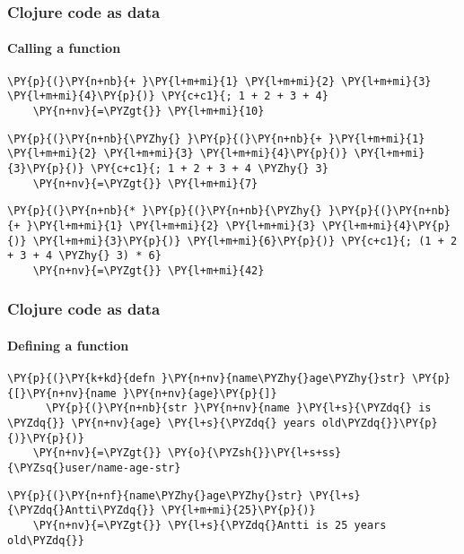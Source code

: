 \begin{frame}[fragile]
  \frametitle{Clojure code as data}
  \framesubtitle {Calling a function}


  \begin{Verbatim}[commandchars=\\\{\}]
    \PY{p}{(}\PY{n+nb}{+ }\PY{l+m+mi}{1} \PY{l+m+mi}{2} \PY{l+m+mi}{3} \PY{l+m+mi}{4}\PY{p}{)} \PY{c+c1}{; 1 + 2 + 3 + 4}
    \PY{n+nv}{=\PYZgt{}} \PY{l+m+mi}{10}
  \end{Verbatim}
  \pause

  \begin{Verbatim}[commandchars=\\\{\}]
    \PY{p}{(}\PY{n+nb}{\PYZhy{} }\PY{p}{(}\PY{n+nb}{+ }\PY{l+m+mi}{1} \PY{l+m+mi}{2} \PY{l+m+mi}{3} \PY{l+m+mi}{4}\PY{p}{)} \PY{l+m+mi}{3}\PY{p}{)} \PY{c+c1}{; 1 + 2 + 3 + 4 \PYZhy{} 3}
    \PY{n+nv}{=\PYZgt{}} \PY{l+m+mi}{7}
  \end{Verbatim}

  \pause
  \begin{Verbatim}[commandchars=\\\{\}]
    \PY{p}{(}\PY{n+nb}{* }\PY{p}{(}\PY{n+nb}{\PYZhy{} }\PY{p}{(}\PY{n+nb}{+ }\PY{l+m+mi}{1} \PY{l+m+mi}{2} \PY{l+m+mi}{3} \PY{l+m+mi}{4}\PY{p}{)} \PY{l+m+mi}{3}\PY{p}{)} \PY{l+m+mi}{6}\PY{p}{)} \PY{c+c1}{; (1 + 2 + 3 + 4 \PYZhy{} 3) * 6}
    \PY{n+nv}{=\PYZgt{}} \PY{l+m+mi}{42}
  \end{Verbatim}
\end{frame}



\begin{frame}[fragile]
  \frametitle{Clojure code as data}
  \framesubtitle{Defining a function}

  \begin{Verbatim}[commandchars=\\\{\}]
    \PY{p}{(}\PY{k+kd}{defn }\PY{n+nv}{name\PYZhy{}age\PYZhy{}str} \PY{p}{[}\PY{n+nv}{name }\PY{n+nv}{age}\PY{p}{]}
      \PY{p}{(}\PY{n+nb}{str }\PY{n+nv}{name }\PY{l+s}{\PYZdq{} is \PYZdq{}} \PY{n+nv}{age} \PY{l+s}{\PYZdq{} years old\PYZdq{}}\PY{p}{)}\PY{p}{)}
    \PY{n+nv}{=\PYZgt{}} \PY{o}{\PYZsh{}}\PY{l+s+ss}{\PYZsq{}user/name-age-str}
  \end{Verbatim}

  \pause

  \begin{Verbatim}[commandchars=\\\{\}]
    \PY{p}{(}\PY{n+nf}{name\PYZhy{}age\PYZhy{}str} \PY{l+s}{\PYZdq{}Antti\PYZdq{}} \PY{l+m+mi}{25}\PY{p}{)}
    \PY{n+nv}{=\PYZgt{}} \PY{l+s}{\PYZdq{}Antti is 25 years old\PYZdq{}}
  \end{Verbatim}
\end{frame}


